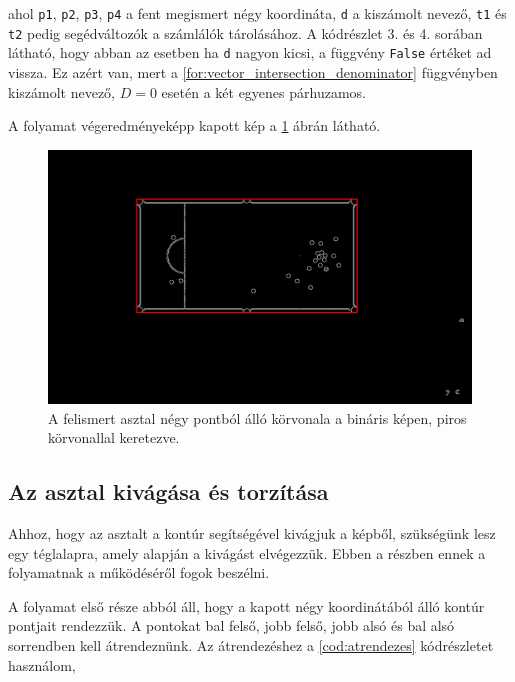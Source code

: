 \par ahol \lstinline{p1}, \lstinline{p2}, \lstinline{p3}, \lstinline{p4} a fent megismert négy koordináta, \lstinline{d} a kiszámolt nevező, \lstinline{t1} és \lstinline{t2} pedig segédváltozók a számlálók tárolásához. A kódrészlet 3. és 4. sorában látható, hogy abban az esetben ha \lstinline{d} nagyon kicsi, a függvény \lstinline{False} értéket ad vissza. Ez azért van, mert a \ref{for:vector_intersection_denominator} függvényben kiszámolt nevező, $D = 0$ esetén a két egyenes párhuzamos.
\par A folyamat végeredményeképp kapott kép a \ref{fig:bemeneti_kep_quad} ábrán látható.

\begin{figure}[!ht]
    \centering
    \includegraphics[width=150mm, keepaspectratio]{figures/input_screen_quad.png}
    \caption{A felismert asztal négy pontból álló körvonala a bináris képen, piros körvonallal keretezve.}
    \label{fig:bemeneti_kep_quad}
\end{figure}

\subsection{Az asztal kivágása és torzítása}
Ahhoz, hogy az asztalt a kontúr segítségével kivágjuk a képből, szükségünk lesz egy téglalapra, amely alapján a kivágást elvégezzük. Ebben a részben ennek a folyamatnak a működéséről fogok beszélni.
\par A folyamat első része abból áll, hogy a kapott négy koordinátából álló kontúr pontjait rendezzük. A pontokat bal felső, jobb felső, jobb alsó és bal alsó sorrendben kell átrendeznünk.
\newline Az átrendezéshez a \ref{cod:atrendezes} kódrészletet használom,

